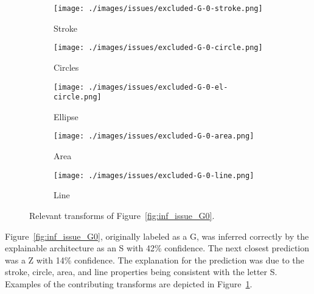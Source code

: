 \begin{figure}[h]
    \centering
    \begin{subfigure}{.20\columnwidth}
        \centering
        \texttt{[image: ./images/issues/excluded-G-0-stroke.png]}
        \caption{Stroke}
    \end{subfigure}%
    \begin{subfigure}{.20\columnwidth}
        \centering
        \texttt{[image: ./images/issues/excluded-G-0-circle.png]}
        \caption{Circles}
    \end{subfigure}%
    \begin{subfigure}{.20\columnwidth}
        \centering
        \texttt{[image: ./images/issues/excluded-G-0-el-circle.png]}
        \caption{Ellipse}
    \end{subfigure}%
    \begin{subfigure}{.20\columnwidth}
        \centering
        \texttt{[image: ./images/issues/excluded-G-0-area.png]}
        \caption{Area}
    \end{subfigure}%
    \begin{subfigure}{.20\columnwidth}
        \centering
        \texttt{[image: ./images/issues/excluded-G-0-line.png]}
        \caption{Line}
    \end{subfigure}
    \caption{Relevant transforms of Figure~\ref{fig:inf_issue_G0}.}
    \label{fig:g0_trans}
\end{figure}

Figure~\ref{fig:inf_issue_G0}, originally labeled as a G, was inferred correctly by
the explainable architecture as an S with 42\% confidence.  The next closest
prediction was a Z with 14\% confidence.  The explanation for the prediction was
due to the stroke, circle, area, and line properties being consistent with the
letter S. Examples of the contributing transforms are depicted in
Figure~\ref{fig:g0_trans}.

